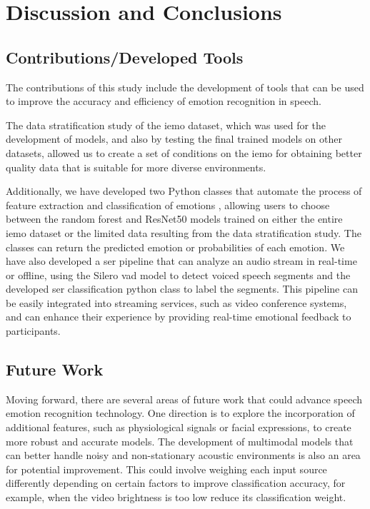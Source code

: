 \chapter{Discussion and Conclusions}
\label{chapter:conc}

\section{Contributions/Developed Tools}


The contributions of this study include the development of tools that can be used to improve the accuracy and efficiency of emotion recognition in speech.

The data stratification study of the \ac{iemo} dataset, which was used for the development of models, and also by testing the final trained models on other datasets, allowed us to create a set of conditions on the \ac{iemo} for obtaining better quality data that is suitable for more diverse environments.

Additionally, we have developed two Python classes that automate the process of feature extraction and classification of emotions \cite{Mario_Silva_Speech_Emotion_Recognition_2023}, allowing users to choose between the random forest and ResNet50 models trained on either the entire \ac{iemo} dataset or the limited data resulting from the data stratification study. The classes can return the predicted emotion or probabilities of each emotion. We have also developed a \ac{ser} pipeline that can analyze an audio stream in real-time or offline, using the Silero \ac{vad} model to detect voiced speech segments and the developed \ac{ser} classification python class to label the segments. This pipeline can be easily integrated into streaming services, such as video conference systems, and can enhance their experience by providing real-time emotional feedback to participants.

\section{Future Work}

Moving forward, there are several areas of future work that could advance speech emotion recognition technology. One direction is to explore the incorporation of additional features, such as physiological signals or facial expressions, to create more robust and accurate models. The development of multimodal models that can better handle noisy and non-stationary acoustic environments is also an area for potential improvement. This could involve weighing each input source differently depending on certain factors to improve classification accuracy, for example, when the video brightness is too low reduce its classification weight.

